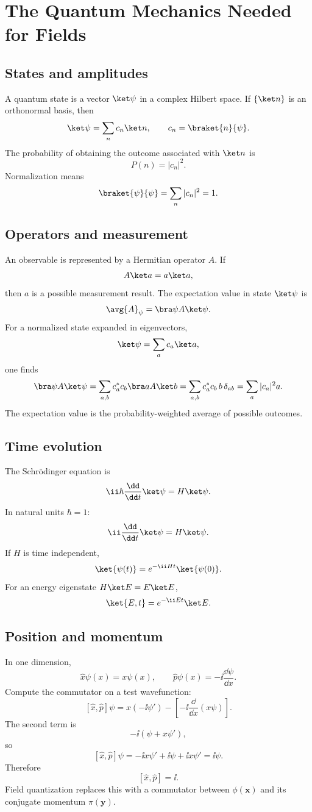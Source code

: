 \chapter{The Quantum Mechanics Needed for Fields}

\section{States and amplitudes}

A quantum state is a vector \(\ket\psi\) in a complex Hilbert space.  If \(\{\ket n\}\) is an orthonormal basis, then
\[
  \ket\psi=\sum_n c_n\ket n,
  \qquad c_n=\braket{n}{\psi}.
\]
The probability of obtaining the outcome associated with \(\ket n\) is
\[
  P(n)=|c_n|^2.
\]
Normalization means
\[
  \braket{\psi}{\psi}=\sum_n|c_n|^2=1.
\]

\section{Operators and measurement}

An observable is represented by a Hermitian operator \(A\).  If
\[
  A\ket a=a\ket a,
\]
then \(a\) is a possible measurement result.  The expectation value in state \(\ket\psi\) is
\[
  \avg{A}_\psi=\bra\psi A\ket\psi.
\]
For a normalized state expanded in eigenvectors,
\[
  \ket\psi=\sum_a c_a\ket a,
\]
one finds
\[
  \bra\psi A\ket\psi
  =
  \sum_{a,b}c_a^*c_b\bra a A\ket b
  =
  \sum_{a,b}c_a^*c_b\,b\,\delta_{ab}
  =
  \sum_a |c_a|^2a.
\]
The expectation value is the probability-weighted average of possible outcomes.

\section{Time evolution}

The Schrödinger equation is
\[
  \ii\hbar\frac{\dd}{\dd t}\ket\psi=H\ket\psi.
\]
In natural units \(\hbar=1\):
\[
  \ii\frac{\dd}{\dd t}\ket\psi=H\ket\psi.
\]
If \(H\) is time independent,
\[
  \ket{\psi(t)}=e^{-\ii Ht}\ket{\psi(0)}.
\]
For an energy eigenstate \(H\ket E=E\ket E\),
\[
  \ket{E,t}=e^{-\ii Et}\ket E.
\]

\section{Position and momentum}

In one dimension,
\[
  \hat x\psi(x)=x\psi(x),
  \qquad
  \hat p\psi(x)=-\ii\frac{\dd\psi}{\dd x}.
\]
Compute the commutator on a test wavefunction:
\[
  [\hat x,\hat p]\psi
  =
  x\left(-\ii\psi'\right)
  -
  \left[-\ii\frac{\dd}{\dd x}(x\psi)\right].
\]
The second term is
\[
  -\ii(\psi+x\psi'),
\]
so
\[
  [\hat x,\hat p]\psi
  =
  -\ii x\psi'+\ii\psi+\ii x\psi'
  =
  \ii\psi.
\]
Therefore
\[
  [\hat x,\hat p]=\ii.
\]
Field quantization replaces this with a commutator between \(\phi(\bm x)\) and its conjugate momentum \(\pi(\bm y)\).

